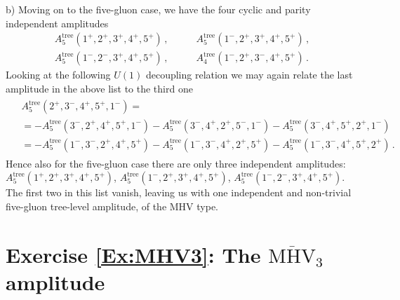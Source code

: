 \medskip\noindent
b) Moving on to the five-gluon case, we have the four 
cyclic and parity independent amplitudes
%
\begin{align*}
A^{\text{tree}}_{5}(1^{+},2^{+},3^{+},4^{+},5^{+}) \, ,\qquad & A^{\text{tree}}_{5}(1^{-},2^{+},3^{+},4^{+},5^{+}) \, ,
\\
A^{\text{tree}}_{5}(1^{-},2^{-},3^{+},4^{+},5^{+})\, , \qquad & A^{\text{tree}}_{4}(1^{-},2^{+},3^{-},4^{+},5^{+})\, .
\end{align*}
%
Looking at the following $U(1)$ decoupling relation we may again relate the last amplitude in the
above list to the third one
\begin{align}
\begin{aligned}
&A^{\text{tree}}_{5}(2^{+},3^{-},4^{+},5^{+},1^{-}) = \\ & =- A^{\text{tree}}_{5}(3^{-},2^{+},4^{+},5^{+},1^{-}) - A^{\text{tree}}_{5}(3^{-},4^{+},2^{+},5^{-},1^{-}) 
- A^{\text{tree}}_{5}(3^{-},4^{+},5^{+},2^{+},1^{-}) 
\\ 
&= - A^{\text{tree}}_{5}(1^{-},3^{-},2^{+},4^{+},5^{+}) - A^{\text{tree}}_{5}(1^{-},3^{-},4^{+},2^{+},5^{+}) -  A^{\text{tree}}_{5}(1^{-},3^{-},4^{+},5^{+},2^{+}) \,.
\end{aligned}
\end{align}
%
Hence also for the five-gluon case there are only three independent amplitudes:
$A^{\text{tree}}_{5}(1^{+},2^{+},3^{+},4^{+},5^{+})$,
$A^{\text{tree}}_{5}(1^{-},2^{+},3^{+},4^{+},5^{+})$, $A^{\text{tree}}_{5}(1^{-},2^{-},3^{+},4^{+},5^{+}) $. The first two in this list vanish, leaving us with one independent and
non-trivial five-gluon tree-level amplitude, of the MHV type.



\section*{Exercise \ref{Ex:MHV3}: The $\overline{\text{MHV}}_3$ amplitude}
\label{Sol:MHV3}

